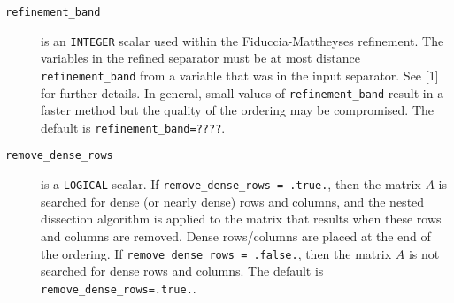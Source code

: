 \begin{description}

\item[\texttt{refinement\_band}] is an {\tt INTEGER} scalar used within the 
Fiduccia-Mattheyses refinement. The variables in the refined separator must be 
at most distance {\tt refinement\_band} from a variable that was in the input 
separator. See [1] for further details. In general, small 
values of {\tt refinement\_band} result in a faster method but the quality of 
the ordering may be compromised. The default is {\tt refinement\_band=????}.

\item[\texttt{remove\_dense\_rows}] is a {\tt LOGICAL} scalar. If {\tt remove\_dense\_rows = .true.}, 
then the matrix $A$ is searched for dense (or nearly dense) rows and columns, 
and the nested dissection algorithm is applied to the matrix that results when 
these rows and columns are removed. Dense rows/columns are placed at the end of 
the ordering. If {\tt remove\_dense\_rows = .false.}, then the matrix $A$ is not 
searched for dense rows and columns. The default is {\tt remove\_dense\_rows=.true.}.




\end{description}
